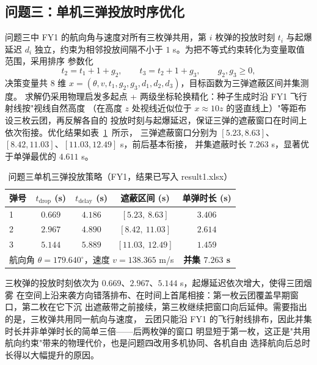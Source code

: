 \documentclass[12pt, a4paper]{article}
\begin{document}
\subsection{问题三：单机三弹投放时序优化}

问题三中 FY1 的航向角与速度对所有三枚弹共用，第 $i$ 枚弹的投放时刻 $t_i$ 与起爆延迟
$d_i$ 独立，约束为相邻投放间隔不小于 $1$ s。为把不等式约束转化为变量取值范围，采用排序
参数化
\begin{equation}
    t_2 = t_1 + 1 + g_2,\qquad t_3 = t_2 + 1 + g_3,\qquad g_2,g_3 \geq 0,
    \label{eq:order}
\end{equation}
决策变量共 8 维 $x=(\theta,v,t_1,g_2,g_3,d_1,d_2,d_3)$，目标函数为三弹遮蔽区间并集测度。
求解仍采用物理启发多起点 + 两级坐标轮换精化：种子生成时沿 FY1 飞行射线按"视线自然高度
（在高度 $z$ 处视线近似位于 $x\approx10z$ 的竖直线上）"等距布设三枚云团，再反解各自的
投放时刻与起爆延迟，保证三弹的遮蔽窗口在时间上依次衔接。优化结果如表~\ref{tab:q3}~所示，
三弹遮蔽窗口分别为 $[5.23,8.63]$、$[8.42,11.03]$、$[11.03,12.49]$ s，前后基本衔接，
并集遮蔽时长 $7.263$ s，显著优于单弹最优的 $4.611$ s。

\begin{table}[H]
\centering
\caption{问题三单机三弹投放策略（FY1，结果已写入 result1.xlsx）}
\label{tab:q3}
\begin{tabular}{lcccc}
\toprule
\textbf{弹号} & $t_{\mathrm{drop}}$ (s) & $t_{\mathrm{delay}}$ (s) & 遮蔽区间 (s) & 单弹时长 (s) \\
\midrule
1 & $0.669$ & $4.186$ & $[5.23,\ 8.63]$ & $3.406$ \\
2 & $2.967$ & $4.890$ & $[8.42,\ 11.03]$ & $2.614$ \\
3 & $5.144$ & $5.889$ & $[11.03,\ 12.49]$ & $1.459$ \\
\midrule
\multicolumn{4}{l}{航向角 $\theta=179.640^{\circ}$，速度 $v=138.365$ m/s} &
\textbf{并集 $7.263$ s} \\
\bottomrule
\end{tabular}
\end{table}

三枚弹的投放时刻依次为 $0.669$、$2.967$、$5.144$ s，起爆延迟依次增大，使得三团烟雾
在空间上沿来袭方向错落排布、在时间上首尾相接：第一枚云团覆盖早期窗口，第二枚在它下沉
出遮蔽带之前接续，第三枚继续把窗口向后延伸。需要指出的是，三枚弹共用同一航向与速度，
云团只能沿 FY1 的飞行射线排布，因此并集时长并非单弹时长的简单三倍——后两枚弹的窗口
明显短于第一枚，这正是"共用航向约束"带来的物理代价，也是问题四改用多机协同、各机自由
选择航向后总时长得以大幅提升的原因。
\end{document}
